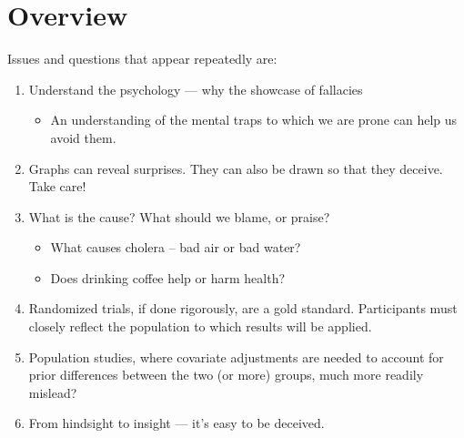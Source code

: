 \documentclass[
  10pt,
  b5paper]{book}
\providecommand{\tightlist}{%
  \setlength{\itemsep}{0pt}\setlength{\parskip}{0pt}}
\begin{document}
\hypertarget{overview}{%
\chapter{Overview}\label{overview}}

Issues and questions that appear repeatedly are:

\begin{enumerate}
\def\labelenumi{\arabic{enumi}.}
\tightlist
\item
  Understand the psychology --- why the showcase of fallacies

  \begin{itemize}
  \tightlist
  \item
    An understanding of the mental traps to which we are prone
    can help us avoid them.\\
  \end{itemize}
\item
  Graphs can reveal surprises. They can also be drawn
  so that they deceive. Take care!\\
\item
  What is the cause? What should we blame, or praise?

  \begin{itemize}
  \tightlist
  \item
    What causes cholera -- bad air or bad water?
  \item
    Does drinking coffee help or harm health?\\
  \end{itemize}
\item
  Randomized trials, if done rigorously, are a gold standard.
  Participants must closely reflect the population to which
  results will be applied.\\
\item
  Population studies, where covariate adjustments are needed
  to account for prior differences between the two (or more)
  groups, much more readily mislead?\\
\item
  From hindsight to insight --- it's easy to be deceived.


\end{enumerate}
\end{document}
